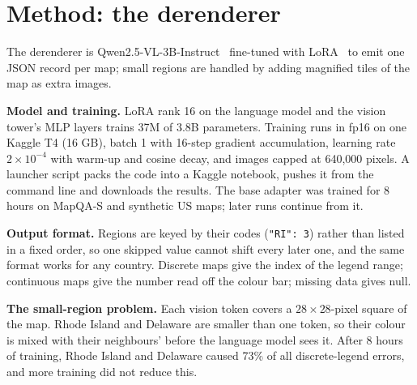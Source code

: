 \documentclass[11pt,a4paper]{article}
\begin{document}
\section{Method: the derenderer}\label{sec:method}
The derenderer is Qwen2.5-VL-3B-Instruct~\cite{qwen25vl} fine-tuned with LoRA~\cite{lora} to emit one JSON record per map; small regions are handled by adding magnified tiles of the map as extra images.

\textbf{Model and training.} LoRA rank 16 on the language model and the vision tower's MLP layers trains 37M of 3.8B parameters. Training runs in fp16 on one Kaggle T4 (16 GB), batch 1 with 16-step gradient accumulation, learning rate $2\times10^{-4}$ with warm-up and cosine decay, and images capped at 640,000 pixels. A launcher script packs the code into a Kaggle notebook, pushes it from the command line and downloads the results. The base adapter was trained for 8 hours on MapQA-S and synthetic US maps; later runs continue from it.

\textbf{Output format.} Regions are keyed by their codes (\texttt{"RI": 3}) rather than listed in a fixed order, so one skipped value cannot shift every later one, and the same format works for any country. Discrete maps give the index of the legend range; continuous maps give the number read off the colour bar; missing data gives null.

\textbf{The small-region problem.} Each vision token covers a $28\times28$-pixel square of the map. Rhode Island and Delaware are smaller than one token, so their colour is mixed with their neighbours' before the language model sees it. After 8 hours of training, Rhode Island and Delaware caused 73\% of all discrete-legend errors, and more training did not reduce this.
\end{document}
